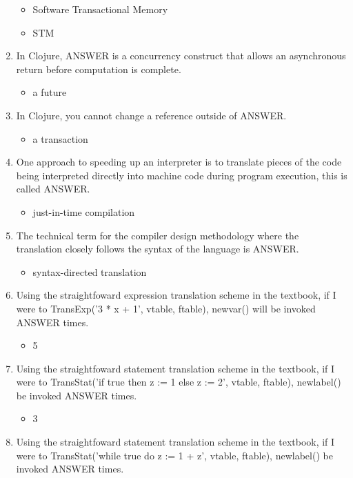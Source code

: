 \documentclass{exam}
\begin{document}
\begin{enumerate}
\begin{itemize}
\item Software Transactional Memory
\item STM
\end{itemize}
\item In Clojure, ANSWER is a concurrency construct that allows an asynchronous return before computation is complete.
\begin{itemize}
\item a future
\end{itemize}
\item In Clojure, you cannot change a reference outside of ANSWER.
\begin{itemize}
\item a transaction
\end{itemize}
\item One approach to speeding up an interpreter is to translate pieces of the code being interpreted directly into machine code during program execution, this is called ANSWER.
\begin{itemize}
\item just-in-time compilation
\end{itemize}
\item The technical term for the compiler design methodology where the translation closely follows the syntax of the language is ANSWER.
\begin{itemize}
\item syntax-directed translation
\end{itemize}
\item Using the straightfoward expression translation scheme in the textbook, if I were to TransExp('3 * x + 1', vtable, ftable), newvar() will be invoked ANSWER times.
\begin{itemize}
\item 5
\end{itemize}
\item Using the straightfoward statement translation scheme in the textbook, if I were to TransStat('if true then z := 1 else z := 2', vtable, ftable), newlabel() be invoked ANSWER times.
\begin{itemize}
\item 3
\end{itemize}
\item Using the straightfoward statement translation scheme in the textbook, if I were to TransStat('while true do z := 1 + z', vtable, ftable), newlabel() be invoked ANSWER times.
\begin{itemize}

\end{itemize}
\end{enumerate}
\end{document}
